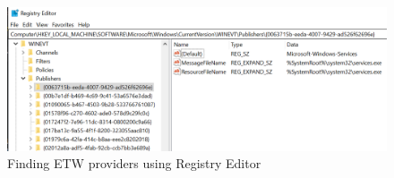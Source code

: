 \documentclass{report}
\begin{document}
\begin{figure}[H]
	\centering
    \includegraphics[width=\textwidth]{etw-providers-registry.png}
    \caption{Finding \gls{ETW} providers using Registry Editor}
    \label{fig:etw:providers:registry}
\end{figure}
\end{document}
